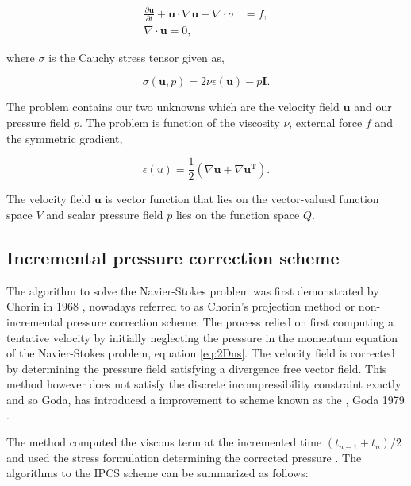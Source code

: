 	\begin{subequations}
	\begin{align}
	\frac{\partial \mathbf{u}}{\partial t} + \mathbf{u}\cdot\nabla\mathbf{u} - \nabla \cdot \sigma &= f,\\
	\nabla \cdot \mathbf{u} = 0,
	\end{align}	
	\label{eq:2Dns}
	\end{subequations}

where $\sigma$ is the Cauchy stress tensor given as,

	\begin{equation}
	\sigma(\mathbf{u},p) = 2\nu\epsilon(\mathbf{u}) - p\mathbf{I}.
	\end{equation}

The problem contains our two unknowns which are the velocity field $\mathbf{u}$ and our pressure field $p$. The problem is function of the viscosity $\nu$, external force $f$ and the symmetric gradient,

	\begin{equation}
	\epsilon(u) = \frac{1}{2} \left(\nabla \mathbf{u} + \nabla \mathbf{u}^{\mathrm{T}}\right).
	\label{eq:symGrad}
	\end{equation}

The velocity field $\mathbf{u}$ is vector function that lies on the vector-valued function space $V$ and scalar pressure field $p$ lies on the function space $Q$.

\subsection{Incremental pressure correction scheme}

The algorithm to solve the Navier-Stokes problem was first demonstrated by Chorin in 1968 \cite{Chorin1968}, nowadays referred to as Chorin's projection method or non-incremental pressure correction scheme. The process relied on first computing a tentative velocity by initially neglecting the pressure in the momentum equation of the Navier-Stokes problem, equation \ref{eq:2Dns}. The velocity field is corrected by determining the pressure field satisfying a divergence free vector field. This method however does not satisfy the discrete incompressibility constraint exactly and so Goda, has introduced a improvement to scheme known as the , Goda 1979 \cite{Goda1979a}.

The method computed the viscous term at the incremented time $(t_{n-1} + t_n)/2$ and used the stress formulation determining the corrected pressure \cite{Logg2012a}. The algorithms to the IPCS scheme can be summarized as follows:


